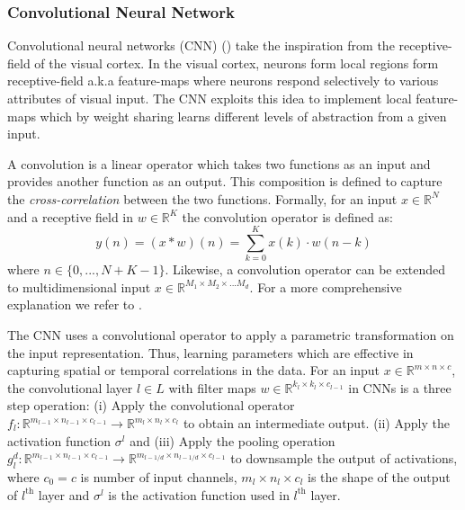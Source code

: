 \subsubsection{Convolutional Neural Network}
\label{sub:cnn}
Convolutional neural networks (CNN) (\cite{lecun1995convolutional}) take the inspiration from the receptive-field of the visual cortex. In the visual cortex, neurons form local regions form receptive-field a.k.a feature-maps where neurons respond selectively to various attributes of visual input. The CNN exploits this idea to implement local feature-maps which by weight sharing learns different levels of abstraction from a given input.  

A convolution is a linear operator which takes two functions as an input and provides another function as an output. This composition is defined to capture the \emph{cross-correlation} between the two functions. Formally, for an input $x\in \mathbb{R}^N$ and a receptive field in $w\in \mathbb{R}^K$ the convolution operator is defined as:
\begin{equation}
\label{eq:conv}
    y(n) = (x \ast w)(n)  = \sum_{k=0}^{K} x(k)\cdot w(n-k)
\end{equation}
where $n\in\{0,...,N+K-1\}$. Likewise, a convolution operator can be extended to multidimensional input $x\in\mathbb{R}^{M_1\times M_2\times ...M_d}$. For a more comprehensive explanation we refer to \citet{Goodfellow-et-al-2016}.

The CNN uses a convolutional operator to apply a parametric transformation on the input representation. Thus, learning parameters which are effective in capturing spatial or temporal correlations in the data. For an input $x\in\mathbb{R}^{m\times n \times c}$, the convolutional layer  $l\in L$ with filter maps $w\in\mathbb{R}^{k_l \times k_l \times c_{l-1}}$ in CNNs is a three step operation: (i) Apply the convolutional operator $f_l:\mathbb{R}^{m_{l-1}\times n_{l-1}\times c_{l-1}} \rightarrow\mathbb{R}^{m_{l}\times n_{l}\times c_{l}}$ to obtain an intermediate output. (ii) Apply the activation function $\sigma^{l}$ and (iii) Apply the pooling operation $g_l^d:\mathbb{R}^{m_{l-1}\times n_{l-1}\times c_{l-1}}\rightarrow \mathbb{R}^{m_{{l-1}/d}\times n_{{l-1}/d}\times c_{l-1}}$ to downsample the output of activations, where $c_0 = c$ is number of input channels, $m_l\times n_l \times c_l$ is the shape of the output of $l^\text{th}$ layer and $\sigma^l$ is the activation function used in $l^\text{th}$ layer.


